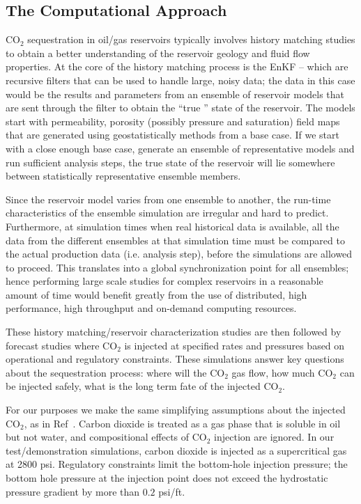 \documentclass{acm_proc_article-sp}
\newcommand{\up}{\vspace*{-0.3em}}
\begin{document}
\subsection{The Computational Approach}
\up 

CO$_2$ sequestration in oil/gas reservoirs typically involves
history matching studies to obtain a better understanding of the
reservoir geology and fluid flow properties.  At the core of the
history matching process is the EnKF -- which are recursive filters
that can be used to handle large, noisy data; the data in this case
would be the results and parameters from an ensemble of reservoir models
that are sent through the filter to obtain the ``true '' state of the
reservoir. The models start with permeability, porosity (possibly
pressure and saturation) field maps that are generated using
geostatistically methods from a base case. If we start with a
close enough base case, generate an ensemble of representative models
and run sufficient analysis steps, the true state of the reservoir
will lie somewhere between statistically representative ensemble members.

Since the reservoir model varies from one ensemble to another, the
run-time characteristics of the ensemble simulation are irregular and
hard to predict. Furthermore, at simulation times when real historical
data is available, all the data from the different ensembles at that
simulation time must be compared to the actual production data (i.e. analysis step), before
the simulations are allowed to proceed. This translates into a global
synchronization point for all ensembles; hence performing large scale
studies for complex reservoirs in a reasonable amount of time would
benefit greatly from the use of distributed, high performance, high
throughput and on-demand computing resources.

These history matching/reservoir characterization studies are then
followed by forecast studies where CO$_2$ is injected at specified
rates and pressures based on operational and regulatory constraints.
These simulations answer key questions about the sequestration
process: where will the CO$_2$ gas flow, how much CO$_2$ can be
injected safely, what is the long term fate of the injected CO$_2$.

For our purposes we make the same simplifying assumptions about the
injected CO$_2$, as in Ref~\cite{Pawar}. Carbon dioxide is treated as
a gas phase that is soluble in oil but not water, and compositional
effects of CO$_2$ injection are ignored. In our test/demonstration
simulations, carbon dioxide is injected as a supercritical gas at 2800
psi. Regulatory constraints limit the bottom-hole injection pressure;
the bottom hole pressure at the injection point does not exceed the
hydrostatic pressure gradient by more than $0.2$ psi/ft.
\up\up\up
\end{document}
